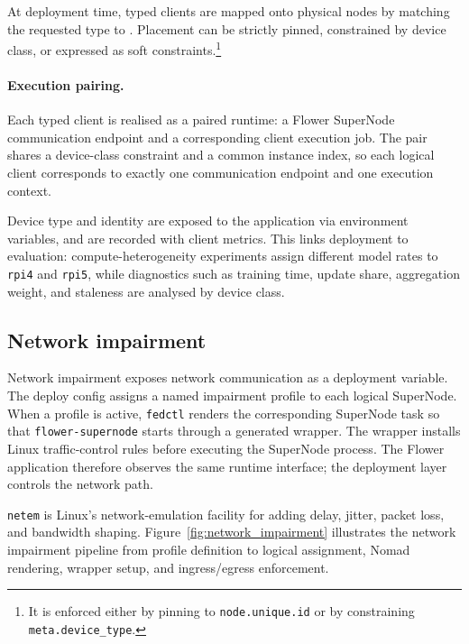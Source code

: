 At deployment time, typed clients are mapped onto physical nodes by matching the requested type to . Placement can be strictly pinned, constrained by device class, or expressed as soft constraints.\footnote{It is enforced either by pinning to \texttt{node.unique.id} or by constraining \texttt{meta.device\_type}.}

\paragraph{Execution pairing.}
Each typed client is realised as a paired runtime: a Flower SuperNode communication endpoint and a corresponding client execution job. The pair shares a device-class constraint and a common instance index, so each logical client corresponds to exactly one communication endpoint and one execution context.

Device type and identity are exposed to the application via environment variables, and are recorded with client metrics. This links deployment to evaluation: compute-heterogeneity experiments assign different model rates to \texttt{rpi4} and \texttt{rpi5}, while diagnostics such as training time, update share, aggregation weight, and staleness are analysed by device class.

\FloatBarrier
\subsection[Network impairment]{Network impairment }

Network impairment exposes network communication as a deployment variable. The deploy config \deployconf{} assigns a named impairment profile to each logical SuperNode. When a profile is active, \texttt{fedctl} renders the corresponding SuperNode task so that \texttt{flower-supernode} starts through a generated wrapper. The wrapper installs Linux traffic-control rules before executing the SuperNode process. The Flower application therefore observes the same runtime interface; the deployment layer controls the network path.

\texttt{netem} is Linux's network-emulation facility for adding delay, jitter, packet loss, and bandwidth shaping. Figure~\ref{fig:network_impairment} illustrates the network impairment pipeline from profile definition to logical assignment, Nomad rendering, wrapper setup, and ingress/egress enforcement.

